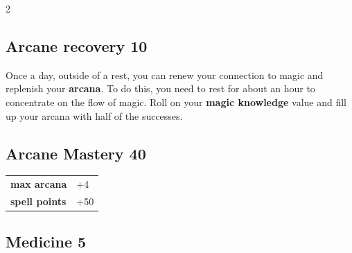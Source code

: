 \begin{multicols}{2}
\begin{tcolorbox}

\end{tcolorbox}

\begin{tcolorbox}
    \subsection*{Arcane recovery \hfill \small{10 }}
    \tcblower
Once a day, outside of a rest, you can renew your connection to magic and replenish your \textbf{arcana}. To do this, you need to rest for about an hour to concentrate on the flow of magic.
Roll on your \textbf{magic knowledge} value and fill up your arcana with half of the successes.


\vspace{3mm}



\end{tcolorbox}

\begin{tcolorbox}
    \subsection*{Arcane Mastery \hfill \small{40 }}
    \tcblower




\begin{tabular}{@{}ll@{}}
    \textbf{max arcana} & +4\\
    \textbf{spell points} & +50\\
\end{tabular}


\end{tcolorbox}

\begin{tcolorbox}
    \subsection*{Medicine \hfill \small{5 }}
    \tcblower





\end{tcolorbox}
\end{multicols}
